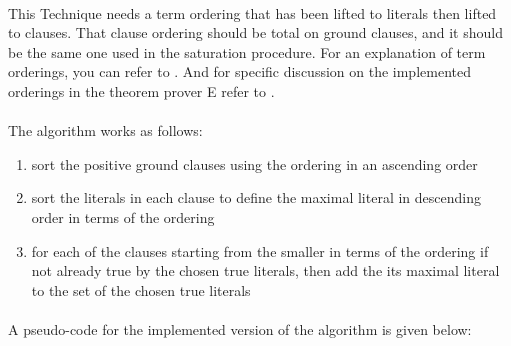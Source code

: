		\paragraph{}
		This Technique needs a term ordering that has been lifted to literals then lifted to clauses. That clause ordering should be total on ground clauses, and it should be the same one used in the saturation procedure. For an explanation of term orderings, you can refer to \cite{BAGA94}. And for specific discussion on the implemented orderings in the theorem prover E refer to \cite{E13}. 
		
		\paragraph{}
		The algorithm works as follows:
			
			\begin{enumerate}
				\item sort the positive ground clauses using the ordering in an ascending order
				\item sort the literals in each clause to define the maximal literal in descending order in terms of the ordering
				\item for each of the clauses starting from the smaller in terms of the ordering if not already true by the chosen true literals, then add the its maximal literal to the set of the chosen true literals 
			\end{enumerate}
		
		\paragraph{}
		A pseudo-code for the implemented version of the algorithm is given below:

